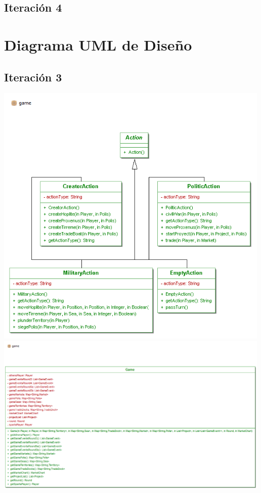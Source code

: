 \documentclass[11 pt]{book}
\begin{document}
		\section*{Iteración 4}
			
\chapter{Diagrama UML de Diseño}
	\section*{Iteración 3}
		\begin{center}
		    \includegraphics[width=500px]{design-uml/iteration3/game-actions.png}
		    \includegraphics[width=500px]{design-uml/iteration3/game-game.png}

\end{center}
\end{document}
